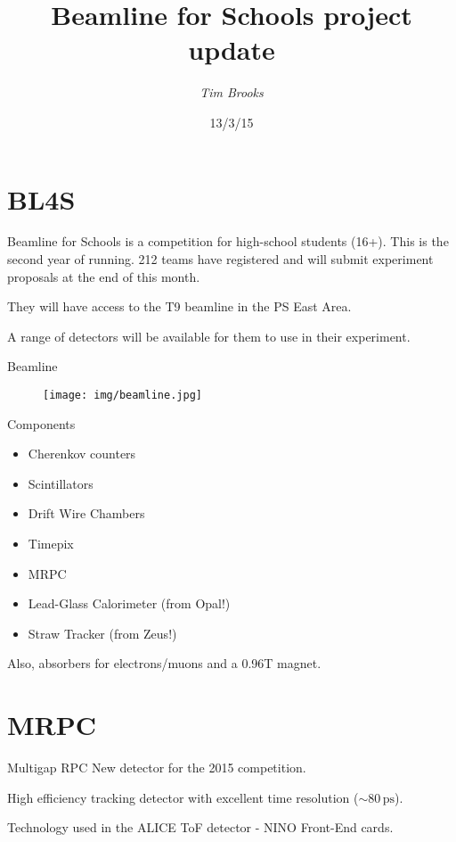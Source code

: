 \documentclass{beamer}
\title[Beamline for Schools\hspace{2em}\insertframenumber/
\inserttotalframenumber]{Beamline for Schools project update}
\author{\emph{Tim Brooks}}
\institute{CERN / RHUL}
\date{13/3/15}
\begin{document}
\begin{frame}
\titlepage
\end{frame}

\section{BL4S}
\begin{frame}
Beamline for Schools is a competition for high-school students (16+). This is the second year of running. 212 teams have registered and will submit experiment proposals at the end of this month.

They will have access to the T9 beamline in the PS East Area.

A range of detectors will be available for them to use in their experiment.
\end{frame}

\begin{frame}{Beamline}
  \begin{figure}
    \centering
    \texttt{[image: img/beamline.jpg]}
  \end{figure}
\end{frame}

\begin{frame}{Components}
\begin{itemize}
\item{Cherenkov counters}
\item{Scintillators}
\item{Drift Wire Chambers}
\item{\color{red}Timepix}
\item{\color{red}MRPC}
\item{Lead-Glass Calorimeter (from Opal!)}
\item{\color{red}Straw Tracker (from Zeus!)}
\end{itemize}
Also, absorbers for electrons/muons and a 0.96T magnet.
\end{frame}

\section{MRPC}
\begin{frame}{Multigap RPC}
New detector for the 2015 competition.

High efficiency tracking detector with excellent time resolution ($\sim80\,\text{ps}$).

Technology used in the ALICE ToF detector - NINO Front-End cards.
\end{frame}
\end{document}
